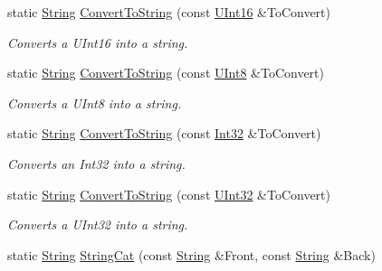 \begin{DoxyCompactItemize}
static \hyperlink{namespaceMezzanine_acf9fcc130e6ebf08e3d8491aebcf1c86}{String} \hyperlink{classMezzanine_1_1StringTool_a8f5811cd7030a50a669cb8a775152cb2}{ConvertToString} (const \hyperlink{namespaceMezzanine_a1b6c09063432c7ddd87011c88306c767}{UInt16} \&ToConvert)
\begin{DoxyCompactList}\small\item\em Converts a UInt16 into a string. \item\end{DoxyCompactList}\item 
static \hyperlink{namespaceMezzanine_acf9fcc130e6ebf08e3d8491aebcf1c86}{String} \hyperlink{classMezzanine_1_1StringTool_a7833e43dc4d039a2d708de97ccfaf2ea}{ConvertToString} (const \hyperlink{namespaceMezzanine_aa5f38583d9025e05fa33d6e32e97b457}{UInt8} \&ToConvert)
\begin{DoxyCompactList}\small\item\em Converts a UInt8 into a string. \item\end{DoxyCompactList}\item 
static \hyperlink{namespaceMezzanine_acf9fcc130e6ebf08e3d8491aebcf1c86}{String} \hyperlink{classMezzanine_1_1StringTool_a95d8c60bc579bd3f0d6e82f68a8f3cb4}{ConvertToString} (const \hyperlink{namespaceMezzanine_a590a2f3eb4a187e1b25209e546e540e1}{Int32} \&ToConvert)
\begin{DoxyCompactList}\small\item\em Converts an Int32 into a string. \item\end{DoxyCompactList}\item 
static \hyperlink{namespaceMezzanine_acf9fcc130e6ebf08e3d8491aebcf1c86}{String} \hyperlink{classMezzanine_1_1StringTool_ad8cb0a779be5d7805def07a8534c75f6}{ConvertToString} (const \hyperlink{namespaceMezzanine_abea3b8e8e9b03d2547b2800284ba682d}{UInt32} \&ToConvert)
\begin{DoxyCompactList}\small\item\em Converts a UInt32 into a string. \item\end{DoxyCompactList}\item 
static \hyperlink{namespaceMezzanine_acf9fcc130e6ebf08e3d8491aebcf1c86}{String} \hyperlink{classMezzanine_1_1StringTool_a51f6de1d1d4f51c43c71a7b34bbfcfec}{StringCat} (const \hyperlink{namespaceMezzanine_acf9fcc130e6ebf08e3d8491aebcf1c86}{String} \&Front, const \hyperlink{namespaceMezzanine_acf9fcc130e6ebf08e3d8491aebcf1c86}{String} \&Back)

\end{DoxyCompactItemize}
